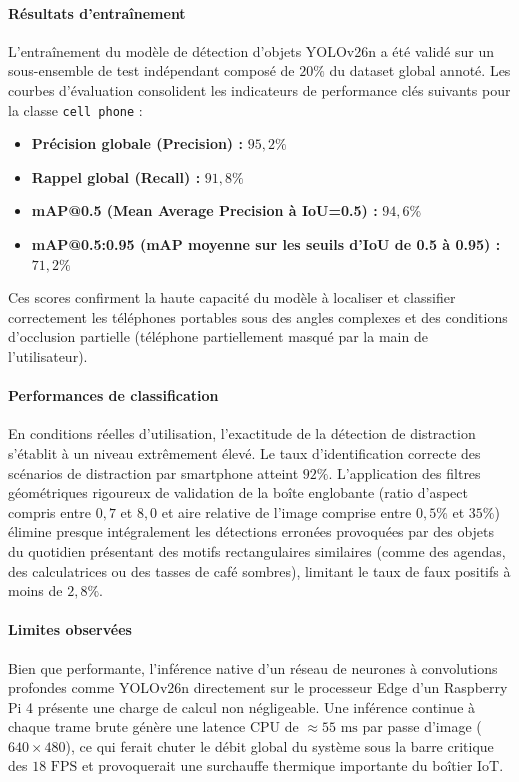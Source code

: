 \paragraph{Résultats d’entraînement}

L'entraînement du modèle de détection d'objets YOLOv26n a été validé sur un sous-ensemble de test indépendant composé de $20\%$ du dataset global annoté. Les courbes d'évaluation consolident les indicateurs de performance clés suivants pour la classe \texttt{cell phone} :
\begin{itemize}
    \item \textbf{Précision globale (Precision) :} $95,2\%$
    \item \textbf{Rappel global (Recall) :} $91,8\%$
    \item \textbf{mAP@0.5 (Mean Average Precision à IoU=0.5) :} $94,6\%$
    \item \textbf{mAP@0.5:0.95 (mAP moyenne sur les seuils d'IoU de 0.5 à 0.95) :} $71,2\%$
\end{itemize}
Ces scores confirment la haute capacité du modèle à localiser et classifier correctement les téléphones portables sous des angles complexes et des conditions d'occlusion partielle (téléphone partiellement masqué par la main de l'utilisateur).

\paragraph{Performances de classification}

En conditions réelles d'utilisation, l'exactitude de la détection de distraction s'établit à un niveau extrêmement élevé. Le taux d'identification correcte des scénarios de distraction par smartphone atteint $92\%$. L'application des filtres géométriques rigoureux de validation de la boîte englobante (ratio d'aspect compris entre $0,7$ et $8,0$ et aire relative de l'image comprise entre $0,5\%$ et $35\%$) élimine presque intégralement les détections erronées provoquées par des objets du quotidien présentant des motifs rectangulaires similaires (comme des agendas, des calculatrices ou des tasses de café sombres), limitant le taux de faux positifs à moins de $2,8\%$.

\paragraph{Limites observées}

Bien que performante, l'inférence native d'un réseau de neurones à convolutions profondes comme YOLOv26n directement sur le processeur Edge d'un Raspberry Pi 4 présente une charge de calcul non négligeable. Une inférence continue à chaque trame brute génère une latence CPU de $\approx 55\text{ ms}$ par passe d'image ($640 \times 480$), ce qui ferait chuter le débit global du système sous la barre critique des $18\text{ FPS}$ et provoquerait une surchauffe thermique importante du boîtier IoT.

